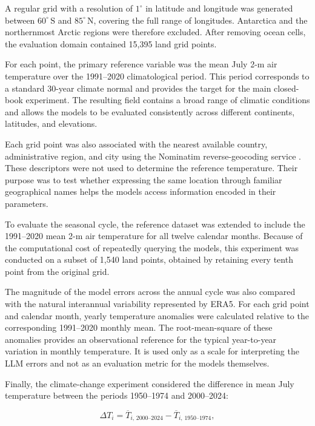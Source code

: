 A regular grid with a resolution of \(1^{\circ}\) in latitude and longitude was generated between \(60^{\circ}\,\mathrm{S}\) and \(85^{\circ}\,\mathrm{N}\), covering the full range of longitudes. Antarctica and the northernmost Arctic regions were therefore excluded. After removing ocean cells, the evaluation domain contained 15,395 land grid points.

For each point, the primary reference variable was the mean July 2-m air temperature over the 1991--2020 climatological period. This period corresponds to a standard 30-year climate normal and provides the target for the main closed-book experiment. The resulting field contains a broad range of climatic conditions and allows the models to be evaluated consistently across different continents, latitudes, and elevations.

Each grid point was also associated with the nearest available country, administrative region, and city using the Nominatim reverse-geocoding service \citep{nominatim_nominatim_2026}. These descriptors were not used to determine the reference temperature. Their purpose was to test whether expressing the same location through familiar geographical names helps the models access information encoded in their parameters.

To evaluate the seasonal cycle, the reference dataset was extended to include the 1991--2020 mean 2-m air temperature for all twelve calendar months. Because of the computational cost of repeatedly querying the models, this experiment was conducted on a subset of 1,540 land points, obtained by retaining every tenth point from the original grid.

The magnitude of the model errors across the annual cycle was also compared with the natural interannual variability represented by ERA5. For each grid point and calendar month, yearly temperature anomalies were calculated relative to the corresponding 1991--2020 monthly mean. The root-mean-square of these anomalies provides an observational reference for the typical year-to-year variation in monthly temperature. It is used only as a scale for interpreting the LLM errors and not as an evaluation metric for the models themselves.

Finally, the climate-change experiment considered the difference in mean July temperature between the periods 1950--1974 and 2000--2024:

\begin{equation}
    \Delta T_i =
    \overline{T}_{i,\,2000\text{--}2024}
    -
    \overline{T}_{i,\,1950\text{--}1974},
\end{equation}


